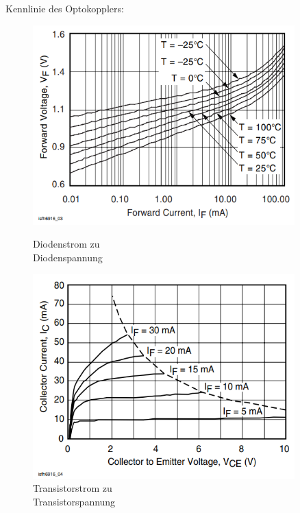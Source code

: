 Kennlinie des Optokopplers:

\begin{figure}[H]
  \begin{minipage}[hbt]{0.45\textwidth}
    \includegraphics[width=0.9\textwidth]{Bilder/Kennlinien/Opto_Vf_If}
 	\caption{Diodenstrom zu \\Diodenspannung}
  	\label{Opto_Vf_If}
  \end{minipage}
\hspace{.03\linewidth}
  \begin{minipage}[hbt]{0.45\textwidth}
    \includegraphics[width=0.9\textwidth]{Bilder/Kennlinien/Opto_Vce_Ic}
  	\caption{Transistorstrom zu \\Transistorspannung}
  	\label{Opto_Vce_Ic}
  \end{minipage}
\end{figure}
